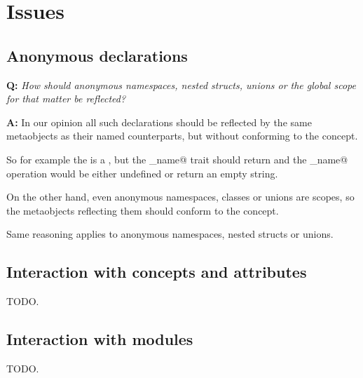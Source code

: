 \section{Issues}

\subsection{Anonymous declarations}

\textbf{Q:} {\em How should anonymous namespaces, nested structs, unions or
the global scope for that matter be reflected?}

\textbf{A:} In our opinion all such declarations should be reflected by
the same metaobjects as their named counterparts, but without conforming
to the  concept.

So for example the  is a , but
the \verb@has_name@ trait should return \verb@false@ and the \verb@get_name@
operation would be either undefined or return an empty string.

On the other hand, even anonymous namespaces, classes or unions are scopes,
so the metaobjects reflecting them should conform to the  concept.

Same reasoning applies to anonymous namespaces, nested structs or unions.

\subsection{Interaction with concepts and attributes}

TODO.

\subsection{Interaction with modules}

TODO.

